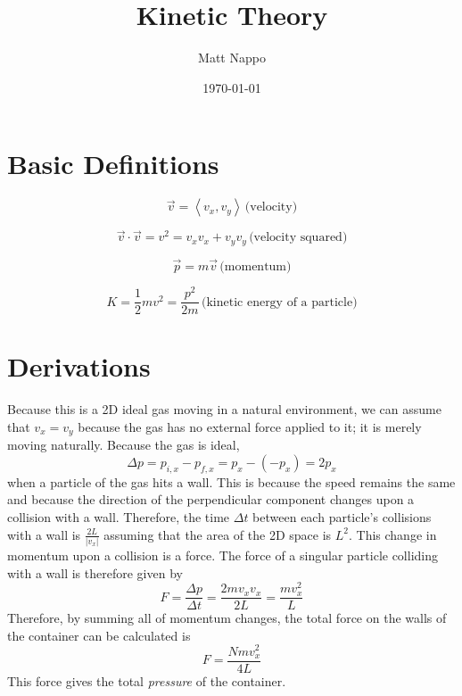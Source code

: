 \documentclass{article}
\title{Kinetic Theory}
\author{Matt Nappo}
\date{\today}
\begin{document}
\section{Basic Definitions}
\indent
$$\vec{v} = \left< v_x, v_y \right> \,\text{(velocity)}$$

$$\vec{v} \cdot \vec{v} = v^2 = v_xv_x + v_yv_y \,\text{(velocity squared)}$$

$$\vec{p} = m\vec{v} \,\text{(momentum)}$$

$$K = \frac{1}{2}mv^2 = \frac{p^2}{2m} \,\text{(kinetic energy of a particle)}$$


\section{Derivations}
Because this is a 2D ideal gas moving in a natural environment, we can assume that $v_x = v_y$ because the gas has no external force applied to it; it is merely moving naturally.
Because the gas is ideal, $$\Delta p = p_{i,x} - p_{f,x} = p_x - (-p_x) = 2p_x$$ when a particle of the gas hits a wall. This is because the speed remains the same and because the direction of the perpendicular component changes upon a collision with a wall.
Therefore, the time $\Delta t$ between each particle's collisions with a wall is $\frac{2L}{|v_x|}$ assuming that the area of the 2D space is $L^2$.
This change in momentum upon a collision is a force. The force of a singular particle colliding with a wall is therefore given by $$F = \frac{\Delta p}{\Delta t} = \frac{2mv_xv_x}{2L} = \frac{mv_x^2}{L}$$ Therefore, by summing all of momentum changes, the total force on the walls of the container can be calculated is $$F = \frac{Nmv_x^2}{4L}$$ This force gives the total \emph{pressure} of the container.
\end{document}
